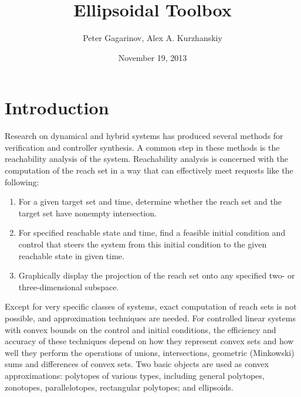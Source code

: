 \documentclass[letterpaper,10pt,english]{sphinxmanual}
\title{Ellipsoidal Toolbox}
\date{November 19, 2013}
\author{Peter Gagarinov, Alex A. Kurzhanskiy}
\begin{document}
\maketitle
\tableofcontents
{}\label{main_manual::doc}



\chapter{Introduction}
\label{chap_intro:introduction}\label{chap_intro::doc}\label{chap_intro:welcome-to-ellipsoidal-toolbox-documentation}
Research on dynamical and hybrid systems has produced several methods
for verification and controller synthesis. A common step in these
methods is the reachability analysis of the system. Reachability
analysis is concerned with the computation of the reach set in a way
that can effectively meet requests like the following:
\begin{enumerate}
\item {} 
For a given target set and time, determine whether the reach set and
the target set have nonempty intersection.

\item {} 
For specified reachable state and time, find a feasible initial
condition and control that steers the system from this initial
condition to the given reachable state in given time.

\item {} 
Graphically display the projection of the reach set onto any
specified two- or three-dimensional subspace.

\end{enumerate}

Except for very specific classes of systems, exact computation of reach
sets is not possible, and approximation techniques are needed. For
controlled linear systems with convex bounds on the control and initial
conditions, the efficiency and accuracy of these techniques depend on
how they represent convex sets and how well they perform the operations
of unions, intersections, geometric (Minkowski) sums and differences of
convex sets. Two basic objects are used as convex approximations:
polytopes of various types, including general polytopes, zonotopes,
parallelotopes, rectangular polytopes; and ellipsoids.
\end{document}
